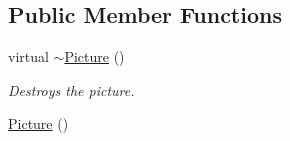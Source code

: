 \subsection*{Public Member Functions}
\begin{DoxyCompactItemize}
\item 
virtual \hyperlink{classPicture_af09bc804565eb973016527ff720ee504}{$\sim$\+Picture} ()
\begin{DoxyCompactList}\small\item\em Destroys the picture. \end{DoxyCompactList}\item 
\hypertarget{classPicture_ae71db353784869ca50fd695c6c89c9f3}{}\hyperlink{classPicture_ae71db353784869ca50fd695c6c89c9f3}{Picture} ()\label{classPicture_ae71db353784869ca50fd695c6c89c9f3}


\end{DoxyCompactItemize}
